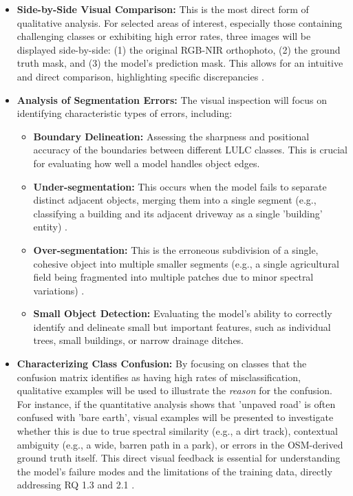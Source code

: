 \documentclass{report}
\begin{document}
\begin{itemize}
\item \textbf{Side-by-Side Visual Comparison:} This is the most direct form of qualitative analysis. For selected areas of interest, especially those containing challenging classes or exhibiting high error rates, three images will be displayed side-by-side: (1) the original RGB-NIR orthophoto, (2) the ground truth mask, and (3) the model's prediction mask. This allows for an intuitive and direct comparison, highlighting specific discrepancies \parencites[p.~316f.;]{KotaridisLazaridouRemotesensingimagesegmentationadvancesmetaanalysis2021a}[p.~12]{SertelEtAlLandUseLandCoverMappingUsingDeepLearningBasedSegmentationApproachesVHRWorldview3Images2022}.
\item \textbf{Analysis of Segmentation Errors:} The visual inspection will focus on identifying characteristic types of errors, including:
\begin{itemize}
    \item \textbf{Boundary Delineation:} Assessing the sharpness and positional accuracy of the boundaries between different LULC classes. This is crucial for evaluating how well a model handles object edges.
    \item \textbf{Under-segmentation:} This occurs when the model fails to separate distinct adjacent objects, merging them into a single segment (e.g., classifying a building and its adjacent driveway as a single 'building' entity) \parencite[p.~339]{CostaEtAlSupervisedmethodsimagesegmentationaccuracyassessmentlandcovermapping2018}.
    \item \textbf{Over-segmentation:} This is the erroneous subdivision of a single, cohesive object into multiple smaller segments (e.g., a single agricultural field being fragmented into multiple patches due to minor spectral variations) \parencite[p.~339]{CostaEtAlSupervisedmethodsimagesegmentationaccuracyassessmentlandcovermapping2018}.
    \item \textbf{Small Object Detection:} Evaluating the model's ability to correctly identify and delineate small but important features, such as individual trees, small buildings, or narrow drainage ditches.
\end{itemize}

\item \textbf{Characterizing Class Confusion:} By focusing on classes that the confusion matrix identifies as having high rates of misclassification, qualitative examples will be used to illustrate the \textit{reason} for the confusion. For instance, if the quantitative analysis shows that 'unpaved road' is often confused with 'bare earth', visual examples will be presented to investigate whether this is due to true spectral similarity (e.g., a dirt track), contextual ambiguity (e.g., a wide, barren path in a park), or errors in the OSM-derived ground truth itself. This direct visual feedback is essential for understanding the model's failure modes and the limitations of the training data, directly addressing RQ 1.3 and 2.1 \parencite[p.~8f., 13.]{SertelEtAlLandUseLandCoverMappingUsingDeepLearningBasedSegmentationApproachesVHRWorldview3Images2022}.
\end{itemize}
\end{document}

